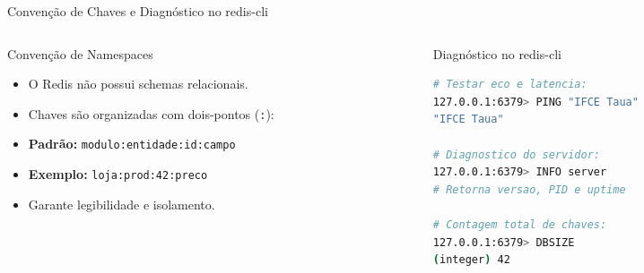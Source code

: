 \begin{frame}[fragile]{Convenção de Chaves e Diagnóstico no redis-cli}
  \begin{columns}[T]
    \begin{column}{0.48\textwidth}
      \alert{Convenção de Namespaces}\par
      \small
      \begin{itemize}
        \item O Redis não possui schemas relacionais.
        \item Chaves são organizadas com dois-pontos (\texttt{:}):
        \item \textbf{Padrão:} \texttt{\scriptsize modulo:entidade:id:campo}
        \item \textbf{Exemplo:} \texttt{\scriptsize loja:prod:42:preco}
        \item Garante legibilidade e isolamento.
      \end{itemize}
    \end{column}
    \begin{column}{0.50\textwidth}
      \alert{Diagnóstico no redis-cli}\par
      \begin{lstlisting}[language=bash]
# Testar eco e latencia:
127.0.0.1:6379> PING "IFCE Taua"
"IFCE Taua"

# Diagnostico do servidor:
127.0.0.1:6379> INFO server
# Retorna versao, PID e uptime

# Contagem total de chaves:
127.0.0.1:6379> DBSIZE
(integer) 42
      \end{lstlisting}
    \end{column}
  \end{columns}
\end{frame}

